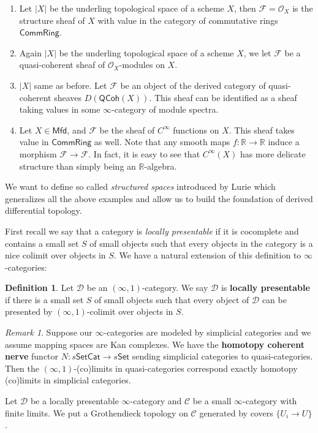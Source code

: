 \documentclass[11pt]{amsart}
\numberwithin{equation}{section}
\theoremstyle{definition}
\newtheorem{defn}[thm]{Definition}
\theoremstyle{remark}
\newtheorem{rem}[thm]{Remark}
\numberwithin{equation}{section}
\newcommand{\CF}{{\mathcal F}}
\newcommand{\CO}{{\mathcal O}}
\newcommand{\R}{{\mathbb{R}}}
\newcommand{\set}{\mathsf{Set}}
\newcommand{\cat}{\mathsf{Cat}}
\newcommand{\mfd}{\mathsf{Mfd}}
\newcommand{\cring}{\mathsf{CommRing}}
\newcommand{\qcoh}{\mathsf{QCoh}}
\begin{document}
	\begin{enumerate}
		\item Let $|X|$ be the underling topological space of a scheme $X$, then $\CF = \CO_X$ is the structure sheaf of $X$ with value in the category of commutative rings $\cring$.
		\item Again $|X|$ be the underling topological space of a scheme $X$, we let $\CF$ be a quasi-coherent sheaf of $\CO_X$-modules on $X$.
		\item $|X|$ same as before. Let $\CF$ be an object of the derived category of quasi-coherent sheaves $D(\qcoh(X))$. This sheaf can be identified as a sheaf taking values in some $\infty$-category of module spectra.
		\item Let $X\in \mfd$, and $\CF$ be the sheaf of $C^{\infty}$ functions on $X$. This sheaf takes value in $\cring$ as well. Note that any smooth maps $f:\R \to \R$ induce a morphism $\CF \to \CF$. In fact, it is easy to see that $C^{\infty}(X)$ has more delicate structure than simply being an $\R$-algebra.  
	\end{enumerate}

We want to define so called {\it structured spaces} introduced by Lurie which generalizes all the above examples and allow us to build the foundation of derived differential topology.

First recall we say that a category is {\it locally presentable} if it is cocomplete and contains a small set $S$ of small objects such that every objects in the category is a nice colimit over objects in $S$. We have a natural extension of this definition to $\infty$-categories:
\begin{defn}
	Let $\mathscr{D}$ be an $(\infty,1)$-category. We say $\mathscr{D}$ is {\bf locally presentable} if there is a small set $S$ of small objects such that every object of $\mathscr{D}$ can be presented by $(\infty,1)$-colimit over objects in $S$.
\end{defn}

\begin{rem}
	Suppose our $\infty$-categories are modeled by simplicial categories and we assume mapping spaces are Kan complexes. We have the {\bf homotopy coherent nerve} functor $N:s\set\cat \to s\set$ sending simplicial categories to quasi-categories. Then the $(\infty,1)$-(co)limits in quasi-categories correspond exactly homotopy (co)limits in simplicial categories. 
\end{rem}


Let $\mathscr{D}$ be a locally presentable $\infty$-category and $\mathscr{C}$ be a small $\infty$-category with finite limits. We put a Grothendieck topology on $\mathscr{C}$ generated by covers $\{U_i\to U \}$.
\end{document}
